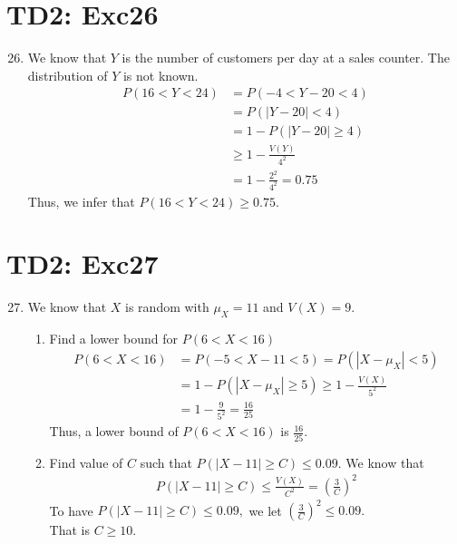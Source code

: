 \documentclass[serif,handout,t]{beamer}
\begin{document}
    \section{TD2: Exc26}
    \begin{frame}[allowframebreaks]
        \begin{enumerate}
            \setcounter{enumi}{25}
            \item We know that $ Y $ is the number of customers per day at a sales counter. The distribution of $ Y $ is not known.
            \begin{align*}
            P(16<Y<24) &=P(-4<Y-20<4)\\
            &=P(|Y-20|<4)\\
            &=1-P(|Y-20|\geq 4)\\
            &\geq 1-\frac{V(Y)}{4^{2}}\\
            &=1-\frac{2^{2}}{4^{2}}=0.75
            \end{align*}
            Thus, we infer that $ P(16<Y<24)\geq 0.75. $
        \end{enumerate}
    \end{frame}
    \section{TD2: Exc27}
    \begin{frame}[allowframebreaks]
        \begin{enumerate}
            \setcounter{enumi}{26}
            \item We know that $ X $ is random with $ \mu_{X}=11 $ and $ V(X)=9. $
            \begin{enumerate}[a]
                \item Find a lower bound for $ P(6<X<16) $
                \begin{align*}
                P(6<X<16) &=P(-5<X-11<5)=P(|X-\mu_{X}|<5)\\
                &=1-P(|X-\mu_{X}|\geq 5)\geq 1-\frac{V(X)}{5^{2}}\\
                &=1-\frac{9}{5^{2}}=\frac{16}{25}
                \end{align*}
                Thus, a lower bound of $ P(6<X<16) $ is $ \frac{16}{25}. $
                \item Find value of $ C $ such that $ P(|X-11|\geq C)\leq 0.09. $ We know that
                \begin{align*}
                P(|X-11|\geq C)\leq \frac{V(X)}{C^{2}}=\left( \frac{3}{C} \right)^{2}
                \end{align*}
                To have $ P(|X-11|\geq C)\leq 0.09, $ we let $ \left( \frac{3}{C} \right)^{2}\leq 0.09. $\\
                That is $ C\geq 10. $
            \end{enumerate}
        \end{enumerate}
    \end{frame}
\end{document}
